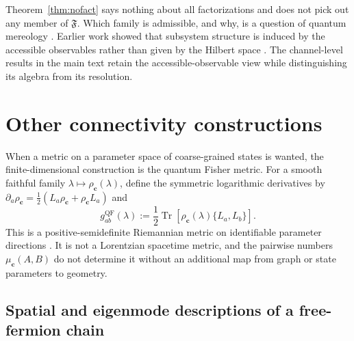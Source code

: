 \documentclass[12pt,a4paper]{article}
\begin{document}
Theorem~\ref{thm:nofact} says nothing about all factorizations and does not pick out any member of $\mathfrak F$. Which family is admissible, and why, is a question of quantum mereology \cite{Cotler2019,CarrollSingh2021}. Earlier work showed that subsystem structure is induced by the accessible observables rather than given by the Hilbert space \cite{Zanardi2001,Zanardi2004}. The channel-level results in the main text retain the accessible-observable view while distinguishing its algebra from its resolution.

\section{Other connectivity constructions}\label{sec:optional-connectivity}

When a metric on a parameter space of coarse-grained states is wanted, the finite-dimensional construction is the quantum Fisher metric. For a smooth faithful family $\lambda\mapsto\rho_{\mathbf c}(\lambda)$, define the symmetric logarithmic derivatives by $\partial_a\rho_{\mathbf c}=\tfrac12(L_a\rho_{\mathbf c}+\rho_{\mathbf c}L_a)$ and
\begin{equation}
g^{\mathrm{QF}}_{ab}(\lambda)
:=\frac12\operatorname{Tr}\!\left[
\rho_{\mathbf c}(\lambda)\{L_a,L_b\}\right].
\label{eq:qfim}
\end{equation}
This is a positive-semidefinite Riemannian metric on identifiable parameter directions \cite{Petz1996}. It is not a Lorentzian spacetime metric, and the pairwise numbers $\mu_{\mathbf c}(A,B)$ do not determine it without an additional map from graph or state parameters to geometry.

\subsection{Spatial and eigenmode descriptions of a free-fermion chain}
\end{document}
